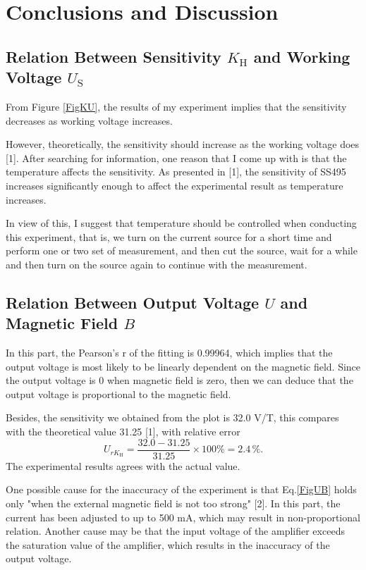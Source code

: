 \documentclass{article}
\begin{document}
		\section{Conclusions and Discussion}
		
	\subsection{Relation Between Sensitivity $K_\text{H}$ and Working Voltage $U_\text{S}$}

From Figure \ref{FigKU}, the results of my experiment implies that the sensitivity decreases as working voltage increases.

However, theoretically, the sensitivity should increase as the working voltage does [1]. After searching for information, one reason that I come up with is that the temperature affects the sensitivity. As presented in [1], the sensitivity of SS495 increases significantly enough to affect the experimental result as temperature increases. 
 
In view of this, I suggest that temperature should be controlled when conducting this experiment, that is, we turn on the current source for a short time and perform one or two set of measurement, and then cut the source, wait for a while and then turn on the source again to continue with the measurement.
	
	\subsection{Relation Between Output Voltage $U$ and Magnetic Field $B$}
	
In this part, the Pearson's r of the fitting is 0.99964, which implies that the output voltage is most likely to be linearly dependent on the magnetic field. Since the output voltage is 0 when magnetic field is zero, then we can deduce that the output voltage is proportional to the magnetic field.

Besides, the sensitivity we obtained from the plot is 32.0 V/T, this compares with the theoretical value 31.25 [1], with relative error
$$U_{rK_\text{H}} = \frac{32.0-31.25}{31.25}\times 100\% = 2.4\,\%.$$
The experimental results agrees with the actual value.

One possible cause for the inaccuracy of the experiment is that Eq.\eqref{FigUB} holds only "when the external magnetic field is not too strong" [2]. In this part, the current has been adjusted to up to 500 mA, which may result in non-proportional relation. Another cause may be that the input voltage of the amplifier exceeds the saturation value of the amplifier, which results in the inaccuracy of the output voltage.
	
\end{document}
